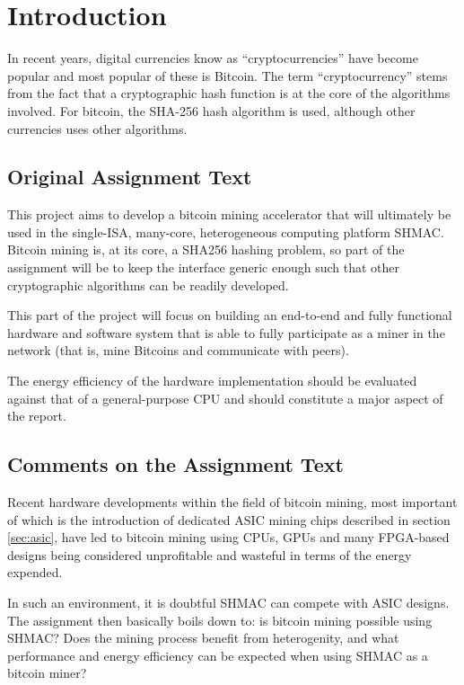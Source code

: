 \chapter{Introduction}

In recent years, digital currencies know as ``cryptocurrencies'' have become popular
and most popular of these is Bitcoin. The term ``cryptocurrency'' stems from the fact
that a cryptographic hash function is at the core of the algorithms involved. For bitcoin,
the SHA-256 hash algorithm is used, although other currencies uses other algorithms.

\section{Original Assignment Text}

This project aims to develop a bitcoin mining accelerator that will ultimately be
used in the single-ISA, many-core, heterogeneous computing platform SHMAC. Bitcoin
mining is, at its core, a SHA256 hashing problem, so part of the assignment will
be to keep the interface generic enough such that other cryptographic algorithms
can be readily developed.

This part of the project will focus on building an end-to-end and fully functional
hardware and software system that is able to fully participate as a miner in the
network (that is, mine Bitcoins and communicate with peers).

The energy efficiency of the hardware implementation should be evaluated against that
of a general-purpose CPU and should constitute a major aspect of the report.

\section{Comments on the Assignment Text}

Recent hardware developments within the field of bitcoin mining, most important of
which is the introduction of dedicated ASIC mining chips described in section \ref{sec:asic},
have led to bitcoin mining using CPUs, GPUs and many FPGA-based designs being considered
unprofitable and wasteful in terms of the energy expended.

In such an environment, it is doubtful SHMAC can compete with ASIC designs.
The assignment then basically boils down to: is bitcoin mining possible using SHMAC?
Does the mining process benefit from heterogenity, and what performance and energy
efficiency can be expected when using SHMAC as a bitcoin miner?

